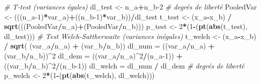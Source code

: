 \documentclass[
  11pt,
  french,
]{book}
\makeatletter
\newenvironment{Shaded}{\begin{snugshade}}{\end{snugshade}}
\newcommand{\CommentTok}[1]{\textcolor[rgb]{0.56,0.35,0.01}{\textit{#1}}}
\newcommand{\DecValTok}[1]{\textcolor[rgb]{0.00,0.00,0.81}{#1}}
\newcommand{\KeywordTok}[1]{\textcolor[rgb]{0.13,0.29,0.53}{\textbf{#1}}}
\newcommand{\NormalTok}[1]{#1}
\newcommand{\OperatorTok}[1]{\textcolor[rgb]{0.81,0.36,0.00}{\textbf{#1}}}
\newcommand{\StringTok}[1]{\textcolor[rgb]{0.31,0.60,0.02}{#1}}
\newenvironment{kframe}{%
\medskip{}
\setlength{\fboxsep}{.8em}
 \def\at@end@of@kframe{}%
 \ifinner\ifhmode%
  \def\at@end@of@kframe{\end{minipage}}%
  \begin{minipage}{\columnwidth}%
 \fi\fi%
 \def\FrameCommand##1{\hskip\@totalleftmargin \hskip-\fboxsep
 \colorbox{shadecolor}{##1}\hskip-\fboxsep
     \hskip-\linewidth \hskip-\@totalleftmargin \hskip\columnwidth}%
 \MakeFramed {\advance\hsize-\width
   \@totalleftmargin\z@ \linewidth\hsize
   \@setminipage}}%
 {\par\unskip\endMakeFramed%
 \at@end@of@kframe}
\renewenvironment{Shaded}{\begin{kframe}}{\end{kframe}}
\makeatother
\begin{document}
\begin{Shaded}
\begin{Highlighting}[]
    \CommentTok{# T-test (variances égales)}
\NormalTok{    dl_test <-}\StringTok{ }\NormalTok{n_a}\OperatorTok{+}\NormalTok{n_b}\DecValTok{-2}       \CommentTok{# degrés de liberté}
\NormalTok{    PooledVar <-}\StringTok{ }\NormalTok{(((n_a}\DecValTok{-1}\NormalTok{)}\OperatorTok{*}\NormalTok{var_a)}\OperatorTok{+}\NormalTok{((n_b}\DecValTok{-1}\NormalTok{)}\OperatorTok{*}\NormalTok{var_b))}\OperatorTok{/}\NormalTok{dl_test}
\NormalTok{    t_test <-}\StringTok{ }\NormalTok{(x_a}\OperatorTok{-}\NormalTok{x_b) }\OperatorTok{/}\StringTok{ }\KeywordTok{sqrt}\NormalTok{(((PooledVar}\OperatorTok{/}\NormalTok{n_a)}\OperatorTok{+}\NormalTok{(PooledVar}\OperatorTok{/}\NormalTok{n_b)))}
\NormalTok{    p_test <-}\StringTok{  }\DecValTok{2}\OperatorTok{*}\NormalTok{(}\DecValTok{1}\OperatorTok{-}\NormalTok{(}\KeywordTok{pt}\NormalTok{(}\KeywordTok{abs}\NormalTok{(t_test), dl_test)))     }
    \CommentTok{# Test Welch-Sattherwaite (variances inégales)}
\NormalTok{    t_welch <-}\StringTok{ }\NormalTok{(x_a}\OperatorTok{-}\NormalTok{x_b) }\OperatorTok{/}\StringTok{ }\KeywordTok{sqrt}\NormalTok{( (var_a}\OperatorTok{/}\NormalTok{n_a) }\OperatorTok{+}\StringTok{ }\NormalTok{(var_b}\OperatorTok{/}\NormalTok{n_b))}
\NormalTok{    dl_num =}\StringTok{ }\NormalTok{((var_a}\OperatorTok{/}\NormalTok{n_a) }\OperatorTok{+}\StringTok{ }\NormalTok{(var_b}\OperatorTok{/}\NormalTok{n_b))}\OperatorTok{^}\DecValTok{2}
\NormalTok{    dl_dem =}\StringTok{ }\NormalTok{((var_a}\OperatorTok{/}\NormalTok{n_a)}\OperatorTok{^}\DecValTok{2}\OperatorTok{/}\NormalTok{(n_a}\DecValTok{-1}\NormalTok{))  }\OperatorTok{+}\StringTok{ }\NormalTok{((var_b}\OperatorTok{/}\NormalTok{n_b)}\OperatorTok{^}\DecValTok{2}\OperatorTok{/}\NormalTok{(n_b}\DecValTok{-1}\NormalTok{))}
\NormalTok{    dl_welch =}\StringTok{ }\NormalTok{dl_num }\OperatorTok{/}\StringTok{ }\NormalTok{dl_dem }\CommentTok{# degrés de liberté}
\NormalTok{    p_welch <-}\StringTok{ }\DecValTok{2}\OperatorTok{*}\NormalTok{(}\DecValTok{1}\OperatorTok{-}\NormalTok{(}\KeywordTok{pt}\NormalTok{(}\KeywordTok{abs}\NormalTok{(t_welch), dl_welch)))     }
    

\end{Highlighting}
\end{Shaded}
\end{document}
